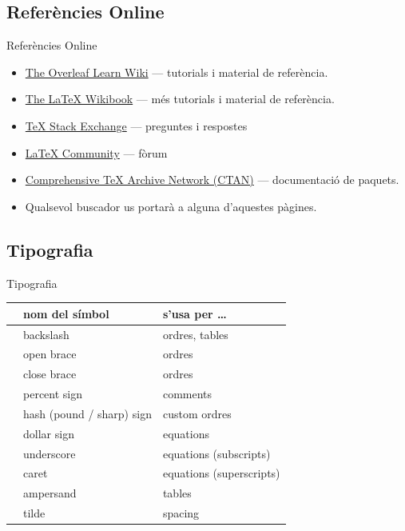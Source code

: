\subsection{Referències Online}
\begin{frame}{Referències Online}
\begin{itemize}
\item \href{https://www.overleaf.com/learn}{The Overleaf Learn Wiki} --- tutorials i material de referència.
\item \href{http://en.wikibooks.org/wiki/LaTeX}{The \LaTeX{} Wikibook} --- més tutorials i material de referència.
\item \href{http://tex.stackexchange.com/}{\TeX{} Stack Exchange} --- preguntes i respostes 
\item \href{http://www.latex-community.org/}{\LaTeX{} Community} --- fòrum 
\item \href{http://ctan.org/}{Comprehensive \TeX{} Archive Network (CTAN)} --- documentació de paquets.
\item Qualsevol buscador us portarà a alguna d'aquestes pàgines.
\end{itemize}
\end{frame}

\subsection{Tipografia}
\begin{frame}{Tipografia}
\begin{tabular}{lll}
& nom del símbol & s'usa per \dots \\\hline
\bftt{\bs} & backslash                 & ordres, tables \\
\bftt{\{}  & open brace                & ordres \\
\bftt{\}}  & close brace               & ordres \\
\bftt{\%}  & percent sign              & comments \\
\bftt{\#}  & hash (pound / sharp) sign & custom ordres \\
\bftt{\$}  & dollar sign               & equations \\
\bftt{\_}  & underscore                & equations (subscripts) \\
\bftt{\^}  & caret                     & equations (superscripts) \\
\bftt{\&}  & ampersand                 & tables \\
\bftt{\~}  & tilde                     & spacing \\
\end{tabular}
\end{frame}




